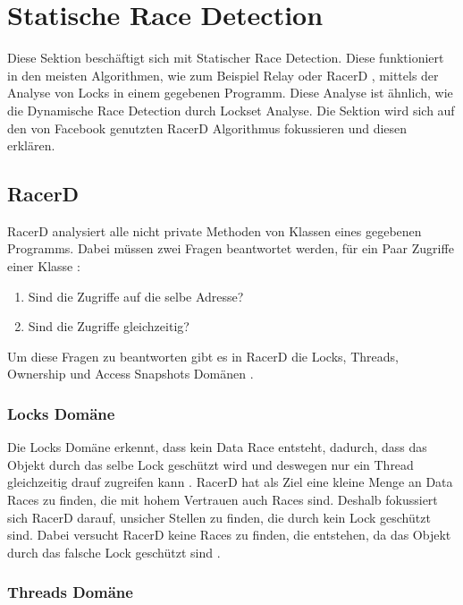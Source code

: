 \section{Statische Race Detection}

Diese Sektion beschäftigt sich mit Statischer Race Detection. Diese funktioniert in den meisten Algorithmen, wie zum Beispiel Relay \cite[vgl.][208]{relay} oder RacerD \cite[vgl.][57]{nikos_2019}, mittels der Analyse von Locks in einem gegebenen Programm. Diese Analyse ist ähnlich, wie die Dynamische Race Detection durch Lockset Analyse. Die Sektion wird sich auf den von Facebook genutzten RacerD Algorithmus \cite[vgl.][2]{racerd} fokussieren und diesen erklären. 

\subsection*{RacerD}

RacerD analysiert alle nicht private Methoden von Klassen eines gegebenen Programms. Dabei müssen zwei Fragen beantwortet werden, für ein Paar Zugriffe einer Klasse \cite[vgl.][7]{racerd}:

\begin{enumerate}
	\item Sind die Zugriffe auf die selbe Adresse?
	\item Sind die Zugriffe gleichzeitig?
\end{enumerate}
\noindent
Um diese Fragen zu beantworten gibt es in RacerD die Locks, Threads, Ownership und Access Snapshots Domänen \cite[vgl.][7-8]{racerd}. 

\subsubsection*{Locks Domäne}

Die Locks Domäne erkennt, dass kein Data Race entsteht, dadurch, dass das Objekt durch das selbe Lock geschützt wird und deswegen nur ein Thread gleichzeitig drauf zugreifen kann \cite[vgl.][8]{racerd}. RacerD hat als Ziel eine kleine Menge an Data Races zu finden, die mit hohem Vertrauen auch Races sind. Deshalb fokussiert sich RacerD darauf, unsicher Stellen zu finden, die durch kein Lock geschützt sind. Dabei versucht RacerD keine Races zu finden, die entstehen, da das Objekt durch das falsche Lock geschützt sind \cite[vgl.][9]{racerd}. 

\subsubsection*{Threads Domäne}


